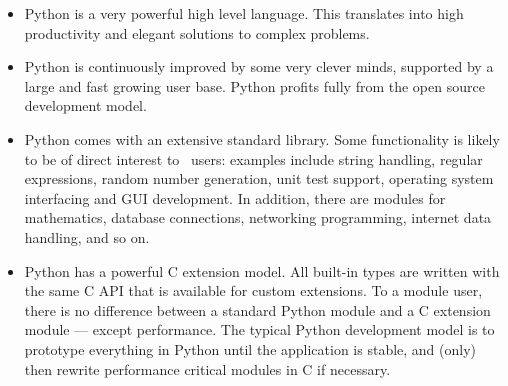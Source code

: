 \begin{itemize}

\item Python is a very powerful high level language. This translates
into high productivity and elegant solutions to complex problems.

\item  Python is continuously improved by some very clever 
minds, supported by a large and fast growing user base. Python profits
fully from the open source development model.

\item Python comes with an extensive standard library. Some
functionality is likely to be of direct interest to \myhdl\ users:
examples include string handling, regular expressions, random number
generation, unit test support, operating system interfacing and GUI
development. In addition, there are modules for mathematics, database
connections, networking programming, internet data handling, and so
on.

\item Python has a powerful C extension model. All built-in types are
written with the same C API that is available for custom
extensions. To a module user, there is no difference between a
standard Python module and a C extension module --- except
performance. The typical Python development model is to prototype
everything in Python until the application is stable, and (only) then
rewrite performance critical modules in C if necessary.

\end{itemize}





